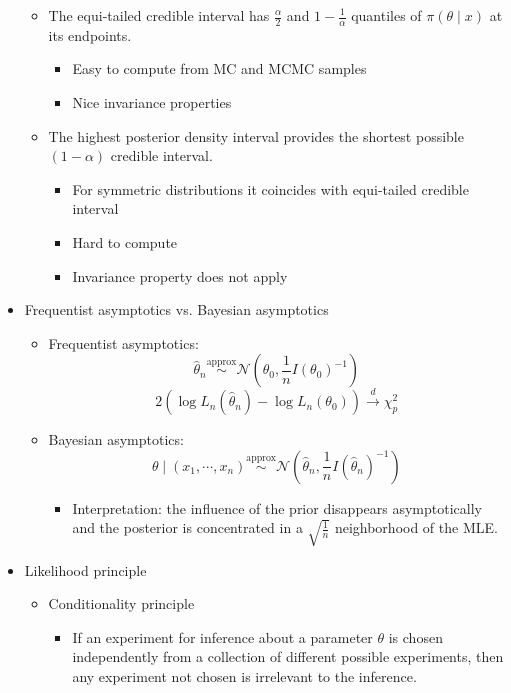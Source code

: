 \documentclass[a4paper]{article}
\begin{document}
\begin{itemize}
    \begin{itemize}
        \item The equi-tailed credible interval has $\frac{\alpha}{2}$ and $1-\frac{1}{\alpha}$ quantiles of $\pi(\theta\mid x)$ at its endpoints.
        \begin{itemize}
            \item Easy to compute from MC and MCMC samples
            \item Nice invariance properties
        \end{itemize}
        \item The highest posterior density interval provides the shortest possible $(1-\alpha)$ credible interval.
        \begin{itemize}
            \item For symmetric distributions it coincides with equi-tailed credible interval
            \item Hard to compute
            \item Invariance property does not apply
        \end{itemize}
    \end{itemize}
    \item Frequentist asymptotics vs. Bayesian asymptotics
    \begin{itemize}
        \item Frequentist asymptotics:
        \[\widehat{\theta}_n\overset{\text{approx}}{\sim}\mathcal{N}\left(\theta_0, \frac{1}{n}I(\theta_0)^{-1} \right) \]
        \[2\left(\log L_n(\widehat{\theta}_n)-\log L_n(\theta_0) \right)\overset{d}{\to}\chi_p^2 \]
        \item Bayesian asymptotics:
        \[\theta\mid(x_1,\cdots,x_n)\overset{\text{approx}}{\sim}\mathcal{N}\left(\widehat{\theta}_n,\frac{1}{n}I(\widehat{\theta}_n)^{-1} \right) \]
        \begin{itemize}
            \item Interpretation: the influence of the prior disappears asymptotically and the posterior is concentrated in a $\sqrt{\frac{1}{n}}$ neighborhood of the MLE.
        \end{itemize}
    \end{itemize}
    \item Likelihood principle
    \begin{itemize}
        \item Conditionality principle
        \begin{itemize}
            \item If an experiment for inference about a parameter $\theta$ is chosen independently from a collection of different possible experiments, then any experiment not chosen is irrelevant to the inference.

\end{itemize}
\end{itemize}
\end{itemize}
\end{document}
